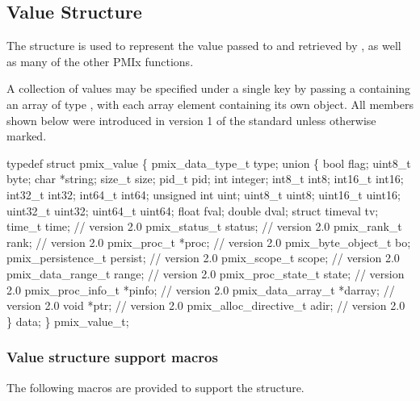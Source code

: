 \subsection{Value Structure}

The  structure is used to represent the value passed to  and retrieved by , as well as many of the other \ac{PMIx} functions.

A collection of values may be specified under a single key by passing a  containing an array of type , with each array element containing its own object. All members shown below were introduced in version 1 of the standard unless otherwise marked.

\cspecificstart
\begin{codepar}
typedef struct pmix_value \{
    pmix_data_type_t type;
    union \{
        bool flag;
        uint8_t byte;
        char *string;
        size_t size;
        pid_t pid;
        int integer;
        int8_t int8;
        int16_t int16;
        int32_t int32;
        int64_t int64;
        unsigned int uint;
        uint8_t uint8;
        uint16_t uint16;
        uint32_t uint32;
        uint64_t uint64;
        float fval;
        double dval;
        struct timeval tv;
        time_t time;                    // version 2.0
        pmix_status_t status;           // version 2.0
        pmix_rank_t rank;               // version 2.0
        pmix_proc_t *proc;              // version 2.0
        pmix_byte_object_t bo;
        pmix_persistence_t persist;     // version 2.0
        pmix_scope_t scope;             // version 2.0
        pmix_data_range_t range;        // version 2.0
        pmix_proc_state_t state;        // version 2.0
        pmix_proc_info_t *pinfo;        // version 2.0
        pmix_data_array_t *darray;      // version 2.0
        void *ptr;                      // version 2.0
        pmix_alloc_directive_t adir;    // version 2.0
    \} data;
\} pmix_value_t;
\end{codepar}
\cspecificend

\subsubsection{Value structure support macros}
The following macros are provided to support the  structure.


